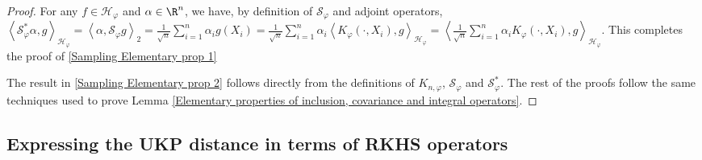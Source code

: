 \documentclass{article} %
\newcommand{\rep}{\varphi}
\newcommand{\Hrep}{\mathcal{H}_{\varphi}}
\newcommand{\Samprep}{\mathcal{S}_{\rep}}
\newcommand{\Samprepad}{\Samprep^{*}}
\newcommand{\Knrep}{K_{n,\rep}}
\newcommand{\inprod}[1]{\left \langle #1 \right\rangle}
\newcommand{\metricstname}{UKP }
\theoremstyle{plain}
\begin{document}
\begin{proof} For any $f \in \Hrep$ and $\alpha \in \R^n$, we have, by definition of $\Samprep$ and adjoint operators, $\inprod{\Samprepad \alpha, g}_{\Hrep}=\inprod{\alpha,\Samprep g}_{2}=\frac{1}{\sqrt{n}} \sum_{i=1}^n \alpha_i g\left(X_i\right)= \frac{1}{\sqrt{n}} \sum_{i=1}^n \alpha_i \inprod{K_{\rep}(\cdot,X_i),g}_{\Hrep} = \inprod{\frac{1}{\sqrt{n}} \sum_{i=1}^n \alpha_i K_{\rep}(\cdot,X_i),g}_{\Hrep}$. This completes the proof of \ref{Sampling Elementary prop 1}

The result in \ref{Sampling Elementary prop 2} follows directly from the definitions of $\Knrep$, $\Samprep$ and $\Samprepad$. The rest of the proofs follow the same techniques used to prove Lemma \ref{Elementary properties of inclusion, covariance and integral operators}.
\end{proof}

\subsection{Expressing the \metricstname distance in terms of RKHS operators}\label{Expressing the UKP distance in terms of RKHS operators}
\end{document}
